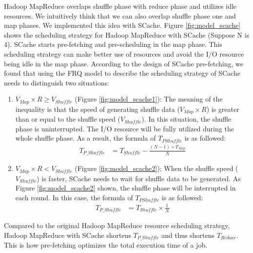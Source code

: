 {Hadoop MapReduce overlaps shuffle phase with reduce phase and utilizes idle resources. We intuitively think that we can also overlap shuffle phase one and map phases. We implemented this idea with SCache.
Figure \ref{fig:model_scache} shows the scheduling strategy for Hadoop MapReduce with SCache (Suppose N is 4). SCache starts pre-fetching and pre-scheduling in the map phase. This scheduling strategy can make better use of resources and avoid the I/O resource being idle in the map phase. According to the design of SCache pre-fetching, we found that using the FRQ model to describe the scheduling strategy of SCache needs to distinguish two situations:

\begin{enumerate}
    \item 
    \(V_{Map} \times R \ge V_{Shuffle}\) (Figure \ref{fig:model_scache1}): 
	The meaning of the inequality is that the speed of generating shuffle data (\(V_{Map} \times R\)) is greater than or equal to the shuffle speed (\(V_{Shuffle}\)). 
	In this situation, the shuffle phase is uninterrupted. The I/O resource will be fully utilized during the whole shuffle phase. As a result, the formula of \(T_{PShuffle}\) is as followed:
	\begin{equation}
		\label{equation_Tpshuffle1}
		\begin{aligned}
			T_{P\_Shuffle} &= T_{Shuffle} - \frac{(N - 1)\times T_{Map}}{N}
		\end{aligned}
	\end{equation}
	
    \item \(V_{Map} \times R < V_{Shuffle}\) (Figure \ref{fig:model_scache2}): 
	When the shuffle speed (\(V_{Shuffle}\)) is faster, SCache needs to wait for shuffle data to be generated. As Figure \ref{fig:model_scache2} shown, the shuffle phase will be interrupted in each round. In this case, the formula of \(T_{PShuffle}\) is as followed:
	\begin{equation}
		\label{equation_Tpshuffle2}
		\begin{aligned}
			T_{P\_Shuffle} &= T_{Shuffle} \times \frac{1}{N}
		\end{aligned}
	\end{equation}
\end{enumerate}

Compared to the original Hadoop MapReduce resource scheduling strategy, Hadoop MapReduce with SCache shortens \(T_{P\_Shuffle}\) and thus shortens \(T_{Reduce}\). This is how pre-fetching optimizes the total execution time of a job.

}
